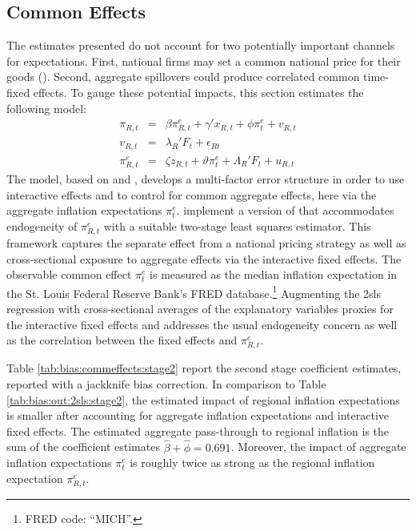 \documentclass[12pt]{article}
\begin{document}
\subsection{Common Effects}

The estimates presented do not account for two potentially important channels for expectations.  First, national firms may set a common national price for their goods (\cite{DellaVignaGentzkow:QJE2019}).  Second, aggregate spillovers could produce correlated common time-fixed effects.  To gauge these potential impacts, this section estimates the following model:
\begin{eqnarray*}
\pi_{R,t} &=& \beta \pi^e_{R,t} + \gamma' x_{R,t} + \phi\pi^e_t +  v_{R,t}\\
v_{R,t} &=& \lambda_R'F_t+\epsilon_{Rt}\\
\pi^e_{R,t} &=& \zeta z_{R,t} + \vartheta \pi^e_t + \Lambda_R'F_t + u_{R,t}
\end{eqnarray*}
The model, based on \cite{Bai:2009} and \cite{Pesaran:2006}, develops a multi-factor error structure in order to use interactive effects and to control for common aggregate effects, here via the aggregate inflation expectations $\pi^e_t$.  \cite{HardingLamarche:EL} implement a version of \cite{Pesaran:2006} that accommodates endogeneity of $\pi^e_{R,t}$ with a suitable two-stage least squares estimator.  This framework captures the separate effect from a national pricing strategy as well as cross-sectional exposure to aggregate effects via the interactive fixed effects.  The observable common effect $\pi^e_t$ is measured as the median inflation expectation in the St. Louis Federal Reserve Bank's FRED database.\footnote{FRED code: ``MICH''.}  Augmenting the 2sls regression with cross-sectional averages of the explanatory variables proxies for the interactive fixed effects and addresses the usual endogeneity concern as well as the correlation between the fixed effects and $\pi^e_{R,t}$.

Table \ref{tab:bias:commeffects:stage2} report the second stage coefficient estimates, reported with a jackknife bias correction.  In comparison to Table \ref{tab:bias:out:2sls:stage2}, the estimated impact of regional inflation expectations is smaller after accounting for aggregate inflation expectations and interactive fixed effects.  The estimated aggregate pass-through to regional inflation is the sum of the coefficient estimates $\hat{\beta}+\hat{\phi} = 0.691$.  Moreover, the impact of aggregate inflation expectations $\pi^e_t$ is roughly twice as strong as the regional inflation expectation $\pi^e_{R,t}$.  
\end{document}
